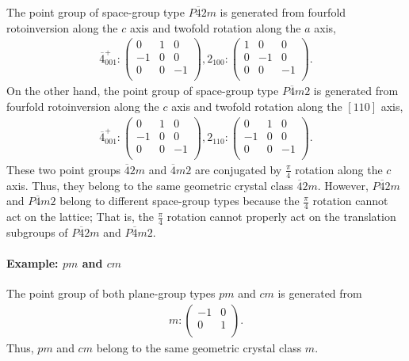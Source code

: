 The point group of space-group type $P\overline{4}2m$ is generated from fourfold rotoinversion along the $c$ axis and twofold rotation along the $a$ axis,
\begin{align*}
  \overline{4}^{+}_{001}:
    \begin{pmatrix}
      0 & 1 & 0 \\
      -1 & 0 & 0 \\
      0 & 0 & -1 \\
    \end{pmatrix},
  2_{100}:
    \begin{pmatrix}
      1 & 0 & 0 \\
      0 & -1 & 0 \\
      0 & 0 & -1 \\
    \end{pmatrix}.
\end{align*}
On the other hand, the point group of space-group type $P\overline{4}m2$ is generated from fourfold rotoinversion along the $c$ axis and twofold rotation along the $[110]$ axis,
\begin{align*}
  \overline{4}^{+}_{001}:
    \begin{pmatrix}
      0 & 1 & 0 \\
      -1 & 0 & 0 \\
      0 & 0 & -1 \\
    \end{pmatrix},
  2_{110}:
    \begin{pmatrix}
      0 & 1 & 0 \\
      -1 & 0 & 0 \\
      0 & 0 & -1 \\
    \end{pmatrix}.
\end{align*}
These two point groups $\overline{4}2m$ and $\overline{4}m2$ are conjugated by $\frac{\pi}{4}$ rotation along the $c$ axis.
Thus, they belong to the same geometric crystal class $\overline{4}2m$.
However, $P\overline{4}2m$ and $P\overline{4}m2$ belong to different space-group types because the $\frac{\pi}{4}$ rotation cannot act on the lattice;
That is, the $\frac{\pi}{4}$ rotation cannot properly act on the translation subgroups of $P\overline{4}2m$ and $P\overline{4}m2$.

\paragraph{Example: $pm$ and $cm$}

The point group of both plane-group types $pm$ and $cm$ is generated from
\begin{align}
  m:
    \begin{pmatrix}
      -1 & 0 \\
      0 & 1 \\
    \end{pmatrix}.
\end{align}
Thus, $pm$ and $cm$ belong to the same geometric crystal class $m$.

